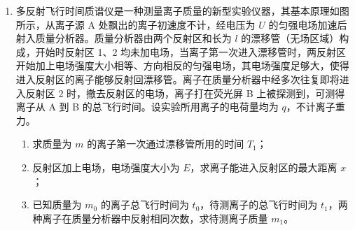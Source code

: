 \documentclass[\gkver]{gaokaozhenti}
\begin{document}
\begin{enumerate}
{$\frac{1}{2}m_{1}v_{A}^{2}=\frac{1}{2}m_{1}v^{2}+2m_{1}gl$②

由动量定理，有

$I=m_{1}v_{A}$③

联立①②③式，得

$I=m_{1}\sqrt{5gl}$④

（2）设两球粘在一起时速度大小为 $v'$，A、B 粘在一起后恰能通过圆周轨迹的最高点，需满足

$v'=v_{A}$⑤

要达到上述条件，碰后两球速度方向必须与碰前 B 的速度方向相同，以此方向为正方向，设 B 碰前瞬间的速度大小为 $v_{B}$，由动量守恒定律，有

$m_{2}v_{B}-m_{1}v_{A}=(m_{1}+m_{2})v'$⑥

又

$E_{k}=\frac{1}{2}m_{2}v_{B}^{2}$⑦

联立①②⑤⑥⑦式，得碰撞前瞬间 B 的动能 $E_{k}$ 至少为

$E_{k}=\frac{5gl(2m_{1}+m_{2})^{2}}{2m_{2}}$⑧
}

\item
多反射飞行时间质谱仪是一种测量离子质量的新型实验仪器，其基本原理如图所示，从离子源 A 处飘出的离子初速度不计，经电压为 $U$ 的匀强电场加速后射入质量分析器。质量分析器由两个反射区和长为 $l$ 的漂移管（无场区域）构成，开始时反射区 1、2 均未加电场，当离子第一次进入漂移管时，两反射区开始加上电场强度大小相等、方向相反的匀强电场，其电场强度足够大，使得进入反射区的离子能够反射回漂移管。离子在质量分析器中经多次往复即将进入反射区 2 时，撤去反射区的电场，离子打在荧光屏 B 上被探测到，可测得离子从 A 到 B 的总飞行时间。设实验所用离子的电荷量均为 $q$，不计离子重力。
\begin{enumerate}
	\item
	求质量为 $m$ 的离子第一次通过漂移管所用的时间 $T_{1}$；
	\item
	反射区加上电场，电场强度大小为 $E$，求离子能进入反射区的最大距离 $x$；
	\item
	已知质量为 $m_{0}$ 的离子总飞行时间为 $t_{0}$，待测离子的总飞行时间为 $t_{1}$，两种离子在质量分析器中反射相同次数，求待测离子质量 $m_{1}$。
\end{enumerate}
\end{enumerate}
\end{document}
